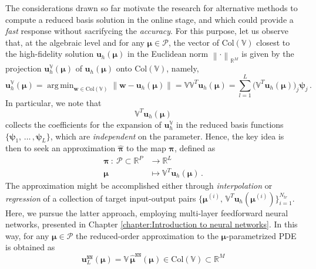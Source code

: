 \documentclass[12pt, a4paper, twoside, openright]{report}
\numberwithin{equation}{chapter}
\theoremstyle{theorem}
\theoremstyle{definition}
\theoremstyle{remark}
\theoremstyle{proposition}
\numberwithin{figure}{chapter}
\DeclareMathOperator*{\argmin}{arg\,min}
\newcommand{\norm}[1]{\left\lVert#1\right\rVert}
\newcommand{\bg}[1]{\boldsymbol{#1}}
\begin{document}
		The considerations drawn so far motivate the research for alternative methods to compute a reduced basis solution in the online stage, and which could provide a \emph{fast} response without sacrifycing the \emph{accuracy}. For this purpose, let us observe that, at the algebraic level and for any $\bg{\mu} \in \mathcal{P}$, the vector of $\text{Col}(\mathbb{V})$ closest to the high-fidelity solution $\mathbf{u}_h(\bg{\mu})$ in the Euclidean norm $\norm{\cdot}_{\mathbb{R}^M}$ is given by the projection $\mathbf{u}_h^{\mathbb{V}}(\bg{\mu})$ of $\mathbf{u}_h(\bg{\mu})$ onto $\text{Col}(\mathbb{V})$, namely,
		\begin{equation}
			\mathbf{u}_h^{\mathbb{V}}(\bg{\mu}) = \argmin_{\mathbf{w} \in \text{Col}(\mathbb{V})}{\norm{\mathbf{w} - \mathbf{u}_h(\bg{\mu})}} = \mathbb{V} \mathbb{V}^T \mathbf{u}_h(\bg{\mu}) = \sum_{l = 1}^L \big( \mathbb{V}^T \mathbf{u}_h(\bg{\mu}) \big)_j \bg{\psi}_j \, .
		\end{equation}
		In particular, we note that
		\begin{equation}
			\mathbb{V}^T \mathbf{u}_h(\bg{\mu})
		\end{equation}
		collects the coefficients for the expansion of $\mathbf{u}_h^{\mathbb{V}}$ in the reduced basis functions $\big\lbrace \bg{\psi}_1, \, \ldots \, , \bg{\psi}_L \big\rbrace$, which are \emph{independent} on the parameter. Hence, the key idea is then to seek an approximation $\hat{\boldsymbol{\pi}}$ to the map $\boldsymbol{\pi}$, defined as
		\begin{equation}
			\label{eq:interpolation-function}
			\begin{aligned}
				\boldsymbol{\pi} ~ : ~ \mathcal{P} \subset \mathbb{R}^P & \rightarrow \mathbb{R}^L \\
				\boldsymbol{\mu} ~ & \mapsto \mathbb{V}^T \mathbf{u}_h(\boldsymbol{\mu}) \, .
			\end{aligned}
		\end{equation} 
		The approximation might be accomplished either through \emph{interpolation} \cite{Ams10, Chen17} or \emph{regression} \cite{Haa13} of a collection of target input-output pairs $\big\lbrace \boldsymbol{\mu}^{(i)}, \, \mathbb{V}^T \mathbf{u}_h(\boldsymbol{\mu}^{(i)}) \big\rbrace_{i = 1}^{N_{tr}}$. Here, we pursue the latter approach, employing multi-layer feedforward neural networks, presented in Chapter \ref{chapter:Introduction to neural networks}. In this way, for any $\bg{\mu} \in \mathcal{P}$ the reduced-order approximation to the $\bg{\mu}$-parametrized PDE is obtained as
		\begin{equation}
			\mathbf{u}_L^{\texttt{NN}}(\bg{\mu}) = \mathbb{V} \, \hat{\bg{\mu}}^{\texttt{NN}}(\bg{\mu}) \in \text{Col}(\mathbb{V}) \subset \mathbb{R}^M
		\end{equation}
\end{document}
